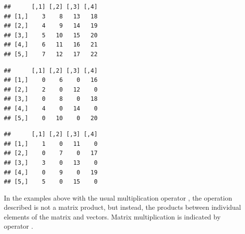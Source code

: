 \documentclass[krantz2]{krantz}\usepackage{knitr}
\begin{document}
\begin{knitrout}\footnotesize
{}\color{fgcolor}\begin{kframe}
\begin{alltt}
 \hlopt{+} 
\end{alltt}
\begin{verbatim}
##      [,1] [,2] [,3] [,4]
## [1,]    3    8   13   18
## [2,]    4    9   14   19
## [3,]    5   10   15   20
## [4,]    6   11   16   21
## [5,]    7   12   17   22
\end{verbatim}
\begin{alltt}
 \hlopt{*} \hlopt{:}
\end{alltt}
\begin{verbatim}
##      [,1] [,2] [,3] [,4]
## [1,]    0    6    0   16
## [2,]    2    0   12    0
## [3,]    0    8    0   18
## [4,]    4    0   14    0
## [5,]    0   10    0   20
\end{verbatim}
\begin{alltt}
 \hlopt{*} \hlopt{:}
\end{alltt}
\begin{verbatim}
##      [,1] [,2] [,3] [,4]
## [1,]    1    0   11    0
## [2,]    0    7    0   17
## [3,]    3    0   13    0
## [4,]    0    9    0   19
## [5,]    5    0   15    0
\end{verbatim}
\end{kframe}
\end{knitrout}

In the examples above with the usual multiplication operator \code{*}, the operation described is not a matrix product, but instead, the products between individual elements of the matrix and vectors. Matrix multiplication is indicated by operator \Roperator{\%*\%}.

\begin{knitrout}\footnotesize
{}\color{fgcolor}
\end{knitrout}
\end{document}
